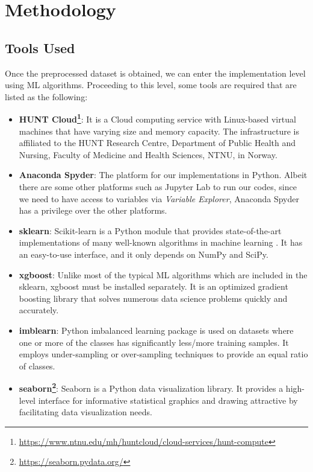 \chapter{Methodology}\label{chap:method}

\section{Tools Used}
Once the preprocessed dataset is obtained, we can enter the implementation level using \acrlong{ML} algorithms. Proceeding to this level, some tools are required that are listed as the following:

\begin{itemize}
    \item \textbf{\acrshort{HUNT} Cloud\footnote{\href{https://www.ntnu.edu/mh/huntcloud/cloud-services/hunt-compute}{https://www.ntnu.edu/mh/huntcloud/cloud-services/hunt-compute}}}: It is a Cloud computing service with Linux-based virtual machines that have varying size and memory capacity. The infrastructure is affiliated to the HUNT Research Centre, Department of Public Health and Nursing, Faculty of Medicine and Health Sciences, \acrfull{NTNU}, in Norway. 
    \item \textbf{Anaconda Spyder}: The platform for our implementations in Python. Albeit there are some other platforms such as Jupyter Lab to run our codes, since we need to have access to variables via \textsl{Variable Explorer}, Anaconda Spyder has a privilege over the other platforms.
    \item \textbf{sklearn}: Scikit-learn is a Python module that provides state-of-the-art implementations of many well-known algorithms in machine learning \cite{pedregosa_scikit-learn_2011}. It has an easy-to-use interface, and it only depends on NumPy and SciPy.
    \item \textbf{xgboost}: Unlike most of the typical \acrshort{ML} algorithms which are included in the sklearn, xgboost must be installed separately. It is an optimized gradient boosting library that solves numerous data science problems quickly and accurately.
    \item \textbf{imblearn}: Python imbalanced learning package is used on datasets where one or more of the classes has significantly less/more training samples. It employs under-sampling or over-sampling techniques to provide an equal ratio of classes.
    \item \textbf{seaborn\footnote{\href{https://seaborn.pydata.org/}{https://seaborn.pydata.org/}}}: Seaborn is a Python data visualization library. It provides a high-level interface for informative statistical graphics and drawing attractive by facilitating data visualization needs.
\end{itemize}

